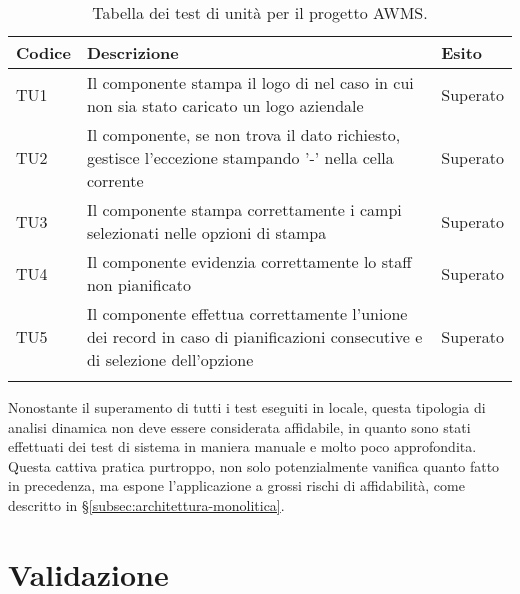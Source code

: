 \begin{center}
	\renewcommand{\arraystretch}{1.5}
	\begin{longtable}{ | p{0.1\linewidth} | p{0.8\linewidth} | p{0.1\linewidth}|}	 
		\hline   
	    \rowcolor{header} \textbf{Codice} & \textbf{Descrizione} & \textbf{Esito}\\
		\hline    	
    	TU1 & Il componente stampa il logo di \AD{} nel caso in cui non sia stato caricato un logo aziendale & Superato  \\
    	TU2 & Il componente, se non trova il dato richiesto, gestisce l'eccezione stampando '-' nella cella corrente & Superato \\
        TU3 & Il componente stampa correttamente i campi selezionati nelle opzioni di stampa & Superato \\
    	TU4 & Il componente evidenzia correttamente lo staff non pianificato & Superato\\
    	TU5 & Il componente effettua correttamente l'unione dei record in caso di pianificazioni consecutive e di selezione dell'opzione & Superato\\
    	\hline
		\rowcolor{white}    	
    	\caption{Tabella dei test di unità per il progetto AWMS.}
	\end{longtable}
	\label{tab:unit-test-awms}
\end{center}
Nonostante il superamento di tutti i test eseguiti in locale, questa tipologia di analisi dinamica non deve essere considerata affidabile, in quanto sono stati effettuati dei test di sistema in maniera manuale e molto poco approfondita. Questa cattiva pratica purtroppo, non solo potenzialmente vanifica quanto fatto in precedenza, ma espone l'applicazione a grossi rischi di affidabilità, come descritto in §\ref{subsec:architettura-monolitica}. 
\section{Validazione}

